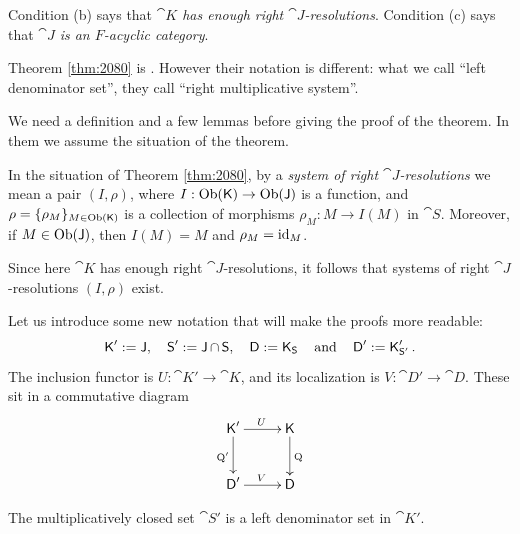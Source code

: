 Condition (b) says that {\em $\cat{K}$ has enough right $\cat{J}$-resolutions}. 
Condition (c) says that {\em $\cat{J}$ is an $F$-acyclic category}. 

Theorem \ref{thm:2080} is \cite[Proposition 7.3.2]{KaSc2}. However their 
notation is different: what we call ``left denominator set'', they call ``right 
multiplicative system''. 

We need a definition and a few lemmas before giving the proof of the theorem.
In them we assume the situation of the theorem. 

\begin{dfn} \label{dfn:2082}
In the situation of Theorem \ref{thm:2080}, by a {\em system of right 
$\cat{J}$-resolutions} we mean a pair $(I, \rho)$, where 
$I : \operatorname{Ob}(\operatorname{\mathsf{K}}) \to \operatorname{Ob}(\operatorname{\mathsf{J}})$
is a function, and 
$\rho = \{ \rho_M \}_{M \in \operatorname{Ob}(\operatorname{\mathsf{K}})}$ 
is a collection of morphisms
$\rho_M : M \to I(M)$ in $\cat{S}$.
Moreover, if $M \in \operatorname{Ob}(\operatorname{\mathsf{J}})$, then 
$I(M) = M$ and $\rho_M = \operatorname{id}_M$. 
\end{dfn}

Since here $\cat{K}$ has enough right $\cat{J}$-resolutions, it follows that
systems of right $\cat{J}$-resolutions $(I, \rho)$ exist.

Let us introduce some new notation that will make the proofs more readable:
\begin{equation} \label{eqn:2098}
\operatorname{\mathsf{K}}' := \operatorname{\mathsf{J}}, \quad \operatorname{\mathsf{S}}' := \operatorname{\mathsf{J}} \cap \operatorname{\mathsf{S}}, 
\quad \operatorname{\mathsf{D}} := \operatorname{\mathsf{K}}_{\operatorname{\mathsf{S}}} \quad \textup{and} 
\quad \operatorname{\mathsf{D}}' := \operatorname{\mathsf{K}}_{\operatorname{\mathsf{S}}'}' . 
\end{equation}
The inclusion functor is $U : \cat{K}' \to \cat{K}$, and its localization is 
$V : \cat{D}' \to \cat{D}$.
These sit in a commutative diagram
\begin{equation} \label{eqn:2083}
\UseTips  \xymatrix @C=6ex @R=6ex {
\cat{K}'
\ar[r]^{U} _(0.5){}="s1"
\ar[d]_{\opn{Q}'}
&
\cat{K}
\ar[d]^{\opn{Q}}
\\
\cat{D}'
\ar[r]^{V} ^(0.5){}="t1"
&
\cat{D} 
}
\end{equation}

\begin{lem} \label{lem:2085}
The multiplicatively closed set $\cat{S}'$ is a left denominator set in 
$\cat{K}'$. 
\end{lem}

